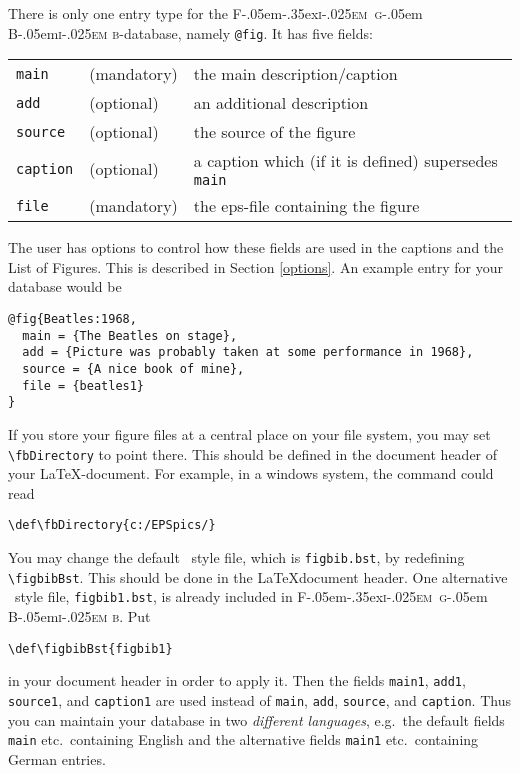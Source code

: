 \documentclass{ltxdoc}
\def\FigBib{{\rmfamily F\kern-.05em\lower-.35ex\hbox{\textsc{i\kern-.025em g}}\kern-.05em%
    B\kern-.05em\textsc{i\kern-.025em b}}}
\begin{document}
There is only one entry type for the \FigBib-database, namely
\texttt{@fig}. It has five fields:

\begin{tabular}{l l l}
\texttt{main} &  (mandatory) &  the main description/caption\\
\texttt{add} &  (optional) &  an additional description\\
\texttt{source} & (optional) &  the source of the figure\\
\texttt{caption} & (optional) &  a caption which (if it is
defined) supersedes \texttt{main}\\
\texttt{file} & (mandatory) &  the eps-file containing the
figure
\end{tabular}

The user has options to control how these fields are used in the
captions and the List of Figures. This is described in Section
\ref{options}. An example entry for your database would be
\begin{verbatim}
@fig{Beatles:1968,
  main = {The Beatles on stage},
  add = {Picture was probably taken at some performance in 1968},
  source = {A nice book of mine},
  file = {beatles1}
}
\end{verbatim}

\DescribeMacro{\fbDirectory}
If you store your figure files at a central place on your file
system, you may set \verb+\fbDirectory+ to point there. This
should be defined in the document header of your
\LaTeX-document. For example, in a windows system, the command could
read
\begin{verbatim}
\def\fbDirectory{c:/EPSpics/}
\end{verbatim}

\DescribeMacro{\figbibBst}
You may change the default \BibTeX\ style file, which is
\texttt{figbib.bst}, by redefining \verb+\figbibBst+. This should
be done in the \LaTeX document header. One alternative \BibTeX\
style file, \texttt{figbib1.bst}, is already included in \FigBib.
Put
\begin{verbatim}
\def\figbibBst{figbib1}
\end{verbatim}
in your document header in order to apply it. Then the fields
\texttt{main1}, \texttt{add1}, \texttt{source1}, and \texttt{caption1}
are used instead of \texttt{main}, \texttt{add}, \texttt{source},
and \texttt{caption}. Thus you can maintain your database in two
\emph{different languages}, e.g.\ the default fields \texttt{main}
etc.\ containing English and the alternative fields \texttt{main1}
etc.\ containing German entries.
\end{document}
